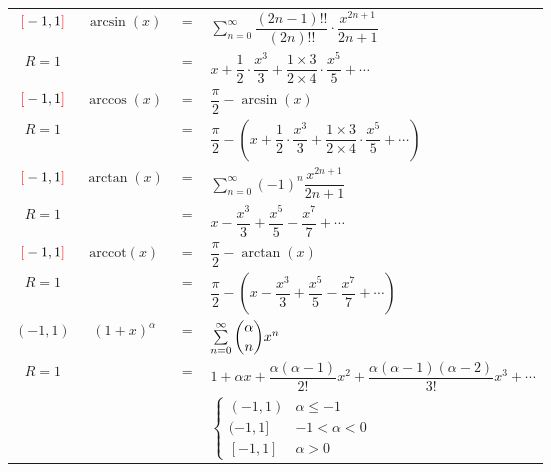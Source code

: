 \documentclass[12pt, a4paper, UTF8, openany]{ctexbook}
\begin{document}
\begin{longtable}[h]{c | c c l}
            \addlinespace
            \midrule
            \addlinespace

            $\textcolor{red}{[} -1, 1 \textcolor{red}{]}$ & $\arcsin(x)$ & $=$ &
            {\large $\sum\limits_{n = 0}^{\infty} \dfrac{(2n - 1)!!}{(2n)!!} \cdot \dfrac{x^{2n + 1}}{2n + 1}$} \\
            $R = 1$ & & $=$ &
            {\large $x + \dfrac{1}{2} \cdot \dfrac{x^3}{3} + \dfrac{1 \times 3}{2 \times 4} \cdot \dfrac{x^5}{5} + \cdots$} \\

            \addlinespace
            \addlinespace

            $\textcolor{red}{[} -1, 1 \textcolor{red}{]}$ & $\arccos(x)$ & $=$ &
            {\large $\dfrac{\pi}{2} - \arcsin(x)$} \\
            $R = 1$ & & $=$ &
            {\large $\dfrac{\pi}{2} - \left(x + \dfrac{1}{2} \cdot \dfrac{x^3}{3} + \dfrac{1 \times 3}{2 \times 4} \cdot \dfrac{x^5}{5} + \cdots\right)$} \\

            \addlinespace
            \addlinespace

            $\textcolor{red}{[} -1, 1 \textcolor{red}{]}$ & $\arctan(x)$ & $=$ &
            {\large $\sum\limits_{n = 0}^{\infty} (-1)^n \dfrac{x^{2n + 1}}{2n + 1}$} \\
            $R = 1$ & & $=$ &
            {\large $x - \dfrac{x^3}{3} + \dfrac{x^5}{5} - \dfrac{x^7}{7} + \cdots$} \\

            \addlinespace
            \addlinespace

            $\textcolor{red}{[} -1, 1 \textcolor{red}{]}$ & $\text{arccot}(x)$ & $=$ &
            {\large $\dfrac{\pi}{2} - \arctan(x)$} \\
            $R = 1$ & & $=$ &
            {\large $\dfrac{\pi}{2} - \left(x - \dfrac{x^3}{3} + \dfrac{x^5}{5} - \dfrac{x^7}{7} + \cdots\right)$} \\

            \addlinespace
            \midrule
            \addlinespace

            $(-1, 1)$ & $(1 + x)^\alpha$ & $=$ &
            {\large $\sum\limits_{n = 0}^{\infty} \dbinom{\alpha}{n} x^n$} \\
            $R = 1$ & & $=$ &
            {\large $1 + \alpha x + \dfrac{\alpha(\alpha - 1)}{2!} x^2 + \dfrac{\alpha(\alpha - 1)(\alpha - 2)}{3!} x^3 + \cdots$} \\
            & & &
            {\large $\begin{cases}
            (-1, 1) & \alpha \leqslant -1 \\
            (-1, 1] & -1 < \alpha < 0 \\
            [-1, 1] & \alpha > 0
            \end{cases}$} \\


\end{longtable}
\end{document}
